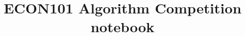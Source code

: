 \documentclass[9pt, a4paper, notitlepage]{extreport}
\title{ECON101 Algorithm Competition notebook}
\begin{document}
    \begin{multicols*}{3}

        \\

        \\
        
        
        
        
        
        
    \end{multicols*}
\end{document}
